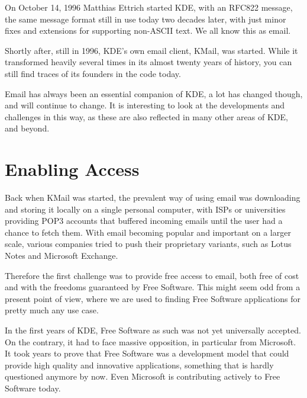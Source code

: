 

\noindent{}On October 14, 1996 Matthias Ettrich started KDE, with an RFC822 message, the same message format still in use today two decades later, with just minor fixes and extensions for supporting non-ASCII text. We all know this as email.

Shortly after, still in 1996, KDE's own email client, KMail, was started. While it transformed heavily several times in its almost twenty years of history, you can still find traces of its founders in the code today.

Email has always been an essential companion of KDE, a lot has changed though, and will continue to change. It is interesting to look at the developments and challenges in this way, as these are also reflected in many other areas of KDE, and beyond.

\section*{Enabling Access}

Back when KMail was started, the prevalent way of using email was downloading and storing it locally on a single personal computer, with ISPs or universities providing POP3 accounts that buffered incoming emails until the user had a chance to fetch them. With email becoming popular and important on a larger scale, various companies tried to push their proprietary variants, such as Lotus Notes and Microsoft Exchange.

Therefore the first challenge was to provide free access to email, both free of cost and with the freedoms guaranteed by Free Software. This might seem odd from a present point of view, where we are used to finding Free Software applications for pretty much any use case.

In the first years of KDE, Free Software as such was not yet universally accepted. On the contrary, it had to face massive opposition, in particular from Microsoft. It took years to prove that Free Software was a development model that could provide high quality and innovative applications, something that is hardly questioned anymore by now. Even Microsoft is contributing actively to Free Software today.


